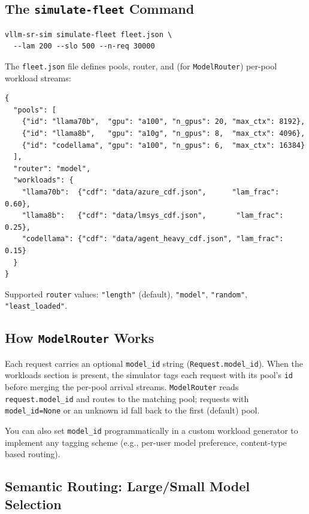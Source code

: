 \documentclass[11pt,a4paper]{article}
\begin{document}
\subsection{The \texttt{simulate-fleet} Command}

\begin{lstlisting}[style=shell]
vllm-sr-sim simulate-fleet fleet.json \
  --lam 200 --slo 500 --n-req 30000
\end{lstlisting}

The \texttt{fleet.json} file defines pools, router, and (for
\texttt{ModelRouter}) per-pool workload streams:

\begin{lstlisting}[style=python]
{
  "pools": [
    {"id": "llama70b",  "gpu": "a100", "n_gpus": 20, "max_ctx": 8192},
    {"id": "llama8b",   "gpu": "a10g", "n_gpus": 8,  "max_ctx": 4096},
    {"id": "codellama", "gpu": "a100", "n_gpus": 6,  "max_ctx": 16384}
  ],
  "router": "model",
  "workloads": {
    "llama70b":  {"cdf": "data/azure_cdf.json",      "lam_frac": 0.60},
    "llama8b":   {"cdf": "data/lmsys_cdf.json",       "lam_frac": 0.25},
    "codellama": {"cdf": "data/agent_heavy_cdf.json", "lam_frac": 0.15}
  }
}
\end{lstlisting}

Supported \texttt{router} values:
\texttt{"length"} (default),
\texttt{"model"},
\texttt{"random"},
\texttt{"least\_loaded"}.

\subsection{How \texttt{ModelRouter} Works}

Each request carries an optional \texttt{model\_id} string
(\texttt{Request.model\_id}).  When the workloads section is present,
the simulator tags each request with its pool's \texttt{id} before
merging the per-pool arrival streams.  \texttt{ModelRouter} reads
\texttt{request.model\_id} and routes to the matching pool; requests
with \texttt{model\_id=None} or an unknown id fall back to the first
(default) pool.

You can also set \texttt{model\_id} programmatically in a custom
workload generator to implement any tagging scheme
(e.g., per-user model preference, content-type based routing).

\subsection{Semantic Routing: Large/Small Model Selection}
\label{sec:semantic}
\end{document}
